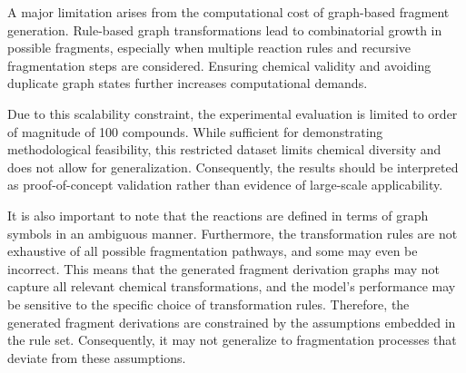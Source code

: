 A major limitation arises from the computational cost of graph-based fragment generation. 
Rule-based graph transformations lead to combinatorial growth in possible fragments, \cite[p.~4]{Andersen2013}
especially when multiple reaction rules and recursive fragmentation steps are considered. 
Ensuring chemical validity and avoiding duplicate graph states 
further increases computational demands. \cite[pp.~2-3]{Boecker2016}

Due to this scalability constraint, the experimental evaluation is 
limited to order of magnitude of 100 compounds. 
While sufficient for demonstrating methodological feasibility, this restricted dataset
limits chemical diversity and does not allow for generalization. 
Consequently, the results should be interpreted as proof-of-concept validation 
rather than evidence of large-scale applicability.

It is also important to note that the reactions are defined in terms of graph symbols in an ambiguous manner.
Furthermore, the transformation rules are not exhaustive of all possible fragmentation pathways, and some may even be incorrect.
This means that the generated fragment derivation graphs may not capture all relevant chemical transformations, 
and the model's performance may be sensitive to the specific choice of transformation rules. 
Therefore, the generated fragment derivations are constrained by the assumptions embedded in the rule set.
Consequently, it may not generalize to fragmentation processes that deviate from these assumptions.